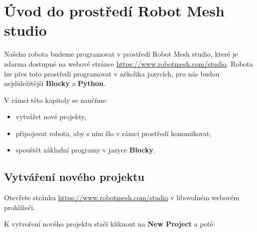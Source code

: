 \documentclass[../main.tex]{subfiles}
\begin{document}
	\section{Úvod do prostředí Robot Mesh studio}

	Našeho robota budeme programovat v prostředí Robot Mesh studio, které je zdarma dostupné na webové stránce \href{https://www.robotmesh.com/studio}{https://www.robotmesh.com/studio}. Robota lze přes toto prostředí programovat v několika jazycích, pro nás budou nejdůležitější \textbf{Blocky} a \textbf{Python}.

	V rámci této kapitoly se naučíme:
	\begin{itemize}
		\item vytvářet nové projekty,
		\item připojovat robota, aby s ním šlo v rámci prostředí komunikovat,
		\item spouštět základní programy v jazyce \textbf{Blocky}.
	\end{itemize}


	\subsection{Vytváření nového projektu}

	Otevřete stránku \href{https://www.robotmesh.com/studio}{https://www.robotmesh.com/studio} v libovolném webovém prohlížeči.

	\begin{figure}[h!]
		\centering
	\end{figure}

	K vytvoření nového projektu stačí kliknout na \textbf{New Project} a poté:
\end{document}
